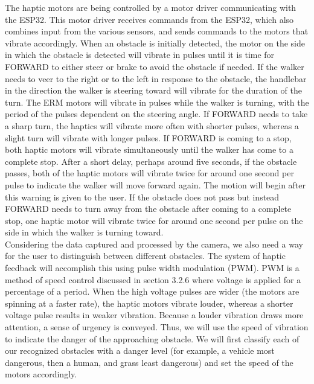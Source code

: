 \noindent The haptic motors are being controlled by a motor driver communicating with the ESP32. This motor driver receives commands from the ESP32, which also combines input from the various sensors, and sends commands to the motors that vibrate accordingly. When an obstacle is initially detected, the motor on the side in which the obstacle is detected will vibrate in pulses until it is time for FORWARD to either steer or brake to avoid the obstacle if needed. If the walker needs to veer to the right or to the left in response to the obstacle, the handlebar in the direction the walker is steering toward will vibrate for the duration of the turn. The ERM motors will vibrate in pulses while the walker is turning, with the period of the pulses dependent on the steering angle. If FORWARD needs to take a sharp turn, the haptics will vibrate more often with shorter pulses, whereas a slight turn will vibrate with longer pulses. If FORWARD is coming to a stop, both haptic motors will vibrate simultaneously until the walker has come to a complete stop. After a short delay, perhaps around five seconds, if the obstacle passes, both of the haptic motors will vibrate twice for around one second per pulse to indicate the walker will move forward again. The motion will begin after this warning is given to the user. If the obstacle does not pass but instead FORWARD needs to turn away from the obstacle after coming to a complete stop, one haptic motor will vibrate twice for around one second per pulse on the side in which the walker is turning toward.\\ 

\noindent Considering the data captured and processed by the camera, we also need a way for the user to distinguish between different obstacles. The system of haptic feedback will accomplish this using pulse width modulation (PWM). PWM is a method of speed control discussed in section 3.2.6 where voltage is applied for a percentage of a period. When the high voltage pulses are wider (the motors are spinning at a faster rate), the haptic motors vibrate louder, whereas a shorter voltage pulse results in weaker vibration. Because a louder vibration draws more attention, a sense of urgency is conveyed. Thus, we will use the speed of vibration to indicate the danger of the approaching obstacle. We will first classify each of our recognized obstacles with a danger level (for example, a vehicle most dangerous, then a human, and grass least dangerous) and set the speed of the motors accordingly.\\

